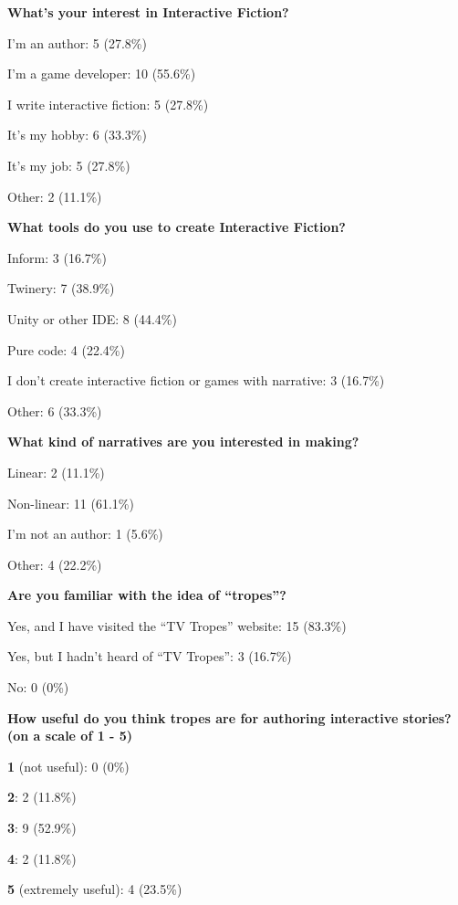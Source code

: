 \textbf{What's your interest in Interactive Fiction?}
\begin{compactitem}
  \item I'm an author: 5 (27.8\%)
  \item I'm a game developer: 10 (55.6\%)
  \item I write interactive fiction: 5 (27.8\%)
  \item It's my hobby: 6 (33.3\%)
  \item It's my job: 5 (27.8\%)
  \item Other: 2 (11.1\%)
\end{compactitem}
\textbf{What tools do you use to create Interactive Fiction?}
\begin{compactitem}
  \item Inform: 3 (16.7\%)
  \item Twinery: 7 (38.9\%)
  \item Unity or other IDE: 8 (44.4\%)
  \item Pure code: 4 (22.4\%)
  \item I don't create interactive fiction or games with narrative: 3 (16.7\%)
  \item Other: 6 (33.3\%)
\end{compactitem}
\textbf{What kind of narratives are you interested in making?}
\begin{compactitem}
  \item Linear: 2 (11.1\%)
  \item Non-linear: 11 (61.1\%)
  \item I'm not an author: 1 (5.6\%)
  \item Other: 4 (22.2\%)
\end{compactitem}
\textbf{Are you familiar with the idea of ``tropes''?}
\begin{compactitem}
  \item Yes, and I have visited the ``TV Tropes'' website: 15 (83.3\%)
  \item Yes, but I hadn't heard of ``TV Tropes'': 3 (16.7\%)
  \item No: 0 (0\%)
\end{compactitem}
\textbf{How useful do you think tropes are for authoring interactive stories?
  (on a scale of 1 - 5)}
\begin{compactitem}
  \item \textbf{1} (not useful): 0 (0\%)
  \item \textbf{2}: 2 (11.8\%)
  \item \textbf{3}: 9 (52.9\%)
  \item \textbf{4}: 2 (11.8\%)
  \item \textbf{5} (extremely useful): 4 (23.5\%)
\end{compactitem}

